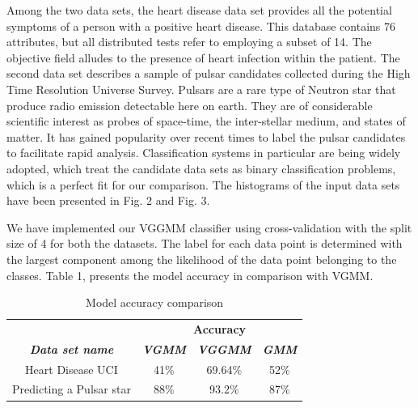 \documentclass[conference]{IEEEtran}
\begin{document}
    

Among the two data sets, the heart disease data set provides all the potential symptoms of a person with a positive heart disease. 
This database contains 76 attributes, but all distributed tests refer to employing a subset of 14. The objective field alludes to the presence of heart infection within the patient.
The second data set describes a sample of pulsar candidates collected during the High Time Resolution Universe Survey.
Pulsars are a rare type of Neutron star that produce radio emission detectable here on earth. They are of considerable scientific interest as probes of space-time, the inter-stellar medium, and states of matter.
It has gained popularity over recent times to label the pulsar candidates to facilitate rapid analysis. Classification systems in particular are being widely adopted, which treat the candidate data sets as binary classification problems, which is a perfect fit for our comparison.
The histograms of the input data sets have been presented in Fig. 2 and Fig. 3. 


We have implemented our VGGMM classifier using cross-validation with the split size of 4 for both the datasets. 
The label for each data point is determined with the largest component among the likelihood of the data point belonging to the classes.
Table 1, presents the model accuracy in comparison with VGMM.



\begin{table}[h!]
    \caption{Model accuracy comparison}
    \begin{center}
    \begin{tabular}{|c|c|c|c|}
    \hline
    \textbf{}&\multicolumn{3}{|c|}{\textbf{Accuracy}} \\
    \cline{2-4} 
    \textbf{\textit{Data set name}}& \textbf{\textit{VGMM}}& \textbf{\textit{VGGMM}} & \textbf{\textit{GMM}}\\
    \hline
    Heart Disease UCI& 41$\%$&69.64$\%$&52$\%$\\
    \hline
    Predicting a Pulsar star& 88$\%$&93.2$\%$&87$\%$\\
    \hline
    \end{tabular}
    \label{tab1}
    \end{center}
\end{table}
\end{document}

